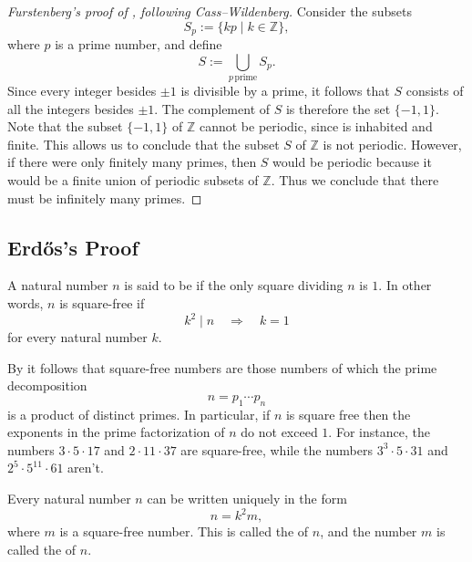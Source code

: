 \begin{proof}[Furstenberg's proof of , following Cass--Wildenberg]
  Consider the subsets
  \begin{equation*}
    S_p:=\{kp\mid k\in\mathbb{Z}\},
  \end{equation*}
  where $p$ is a prime number, and define
  \begin{equation*}
    S:=\bigcup_{p\,\mathrm{prime}}S_p.
  \end{equation*}
  Since every integer besides $\pm 1$ is divisible by a prime, it follows that $S$ consists of all the integers besides $\pm 1$. The complement of $S$ is therefore the set $\{-1,1\}$. Note that the subset $\{-1,1\}$ of $\mathbb{Z}$ cannot be periodic, since is inhabited and finite. This allows us to conclude that the subset $S$ of $\mathbb{Z}$ is not periodic. However, if there were only finitely many primes, then $S$ would be periodic because it would be a finite union of periodic subsets of $\mathbb{Z}$. Thus we conclude that there must be infinitely many primes.
\end{proof}

\subsection{Erd\H{o}s's Proof}

\begin{definition}
  A natural number $n$ is said to be  if the only square dividing $n$ is $1$. In other words, $n$ is square-free if
  \begin{equation*}
    k^2\mid n\quad\Rightarrow\quad k=1
  \end{equation*}
  for every natural number $k$.
\end{definition}

By  it follows that square-free numbers are those numbers of which the prime decomposition
\begin{equation*}
  n=p_1\cdots p_n
\end{equation*}
is a product of distinct primes. In particular, if $n$ is square free then the exponents in the prime factorization of $n$ do not exceed $1$. For instance, the numbers $3\cdot 5\cdot 17$ and $2\cdot 11\cdot 37$ are square-free, while the numbers $3^3\cdot 5\cdot 31$ and $2^5\cdot 5^{11}\cdot 61$ aren't.

\begin{theorem}\label{theorem:square-free-decomposition}
  Every natural number $n$ can be written uniquely in the form
  \begin{equation*}
    n=k^2m,
  \end{equation*}
  where $m$ is a square-free number. This is called the  of $n$, and the number $m$ is called the  of $n$.
\end{theorem}

